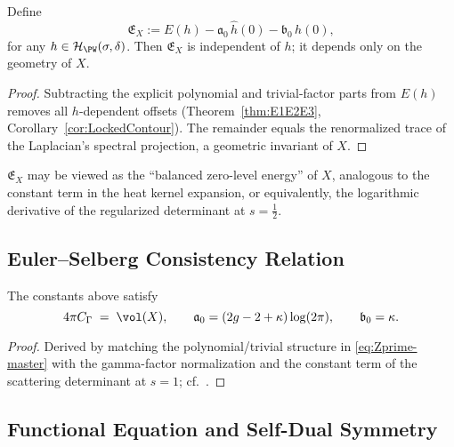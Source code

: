 \begin{theorem} \label{thm:GlobalInvariant} %
Define
\[
  \mathfrak{E}_X
  := E(h) - \mathfrak{a}_0\,\widehat h(0) - \mathfrak{b}_0\,h(0),
\]
for any \(h\in\mathcal H_{\PW}(\sigma,\delta)\).
Then \(\mathfrak{E}_X\) is independent of \(h\); it depends only on the geometry of \(X\). %
\end{theorem}

\begin{proof}
Subtracting the explicit polynomial and trivial-factor parts from \(E(h)\) removes all \(h\)-dependent offsets (Theorem~\ref{thm:E1E2E3}, Corollary~\ref{cor:LockedContour}). The remainder equals the renormalized trace of the Laplacian’s spectral projection, a geometric invariant of \(X\). %
\end{proof}

\begin{remark}[Interpretation]
\(\mathfrak{E}_X\) may be viewed as the “balanced zero-level energy” of \(X\), analogous to the constant term in the heat kernel expansion, or equivalently, the logarithmic derivative of the regularized determinant at \(s=\tfrac12\). %
\end{remark}

\subsection{Euler–Selberg Consistency Relation} \label{subsec:euler-selberg} \relax \hspace{0pt} %

\begin{proposition} \label{prop:EulerSelberg} %
The constants above satisfy
\[
  4\pi C_\Gamma \;=\; \vol(X), \qquad
  \mathfrak{a}_0 = (2g-2+\kappa)\log(2\pi), \qquad
  \mathfrak{b}_0 = \kappa.
\]
\end{proposition}

\begin{proof}
Derived by matching the polynomial/trivial structure in \eqref{eq:Zprime-master} with the gamma-factor normalization and the constant term of the scattering determinant at \(s=1\); cf.\ \cite{HejhalII,Borthwick}. %
\end{proof}

\subsection{Functional Equation and Self-Dual Symmetry} \label{subsec:functional-equation} %

